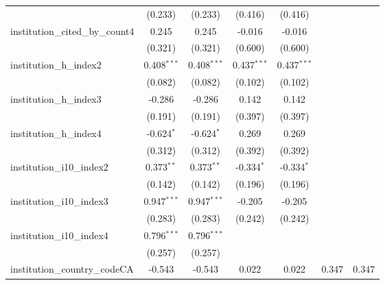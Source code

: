 \begin{tabular}{lcccccc}
                                         & (0.233)       & (0.233)       & (0.416)       & (0.416)       &                &   \\   
   institution\_cited\_by\_count4        & 0.245         & 0.245         & -0.016        & -0.016        &                &   \\   
                                         & (0.321)       & (0.321)       & (0.600)       & (0.600)       &                &   \\   
   institution\_h\_index2                & 0.408$^{***}$ & 0.408$^{***}$ & 0.437$^{***}$ & 0.437$^{***}$ &                &   \\   
                                         & (0.082)       & (0.082)       & (0.102)       & (0.102)       &                &   \\   
   institution\_h\_index3                & -0.286        & -0.286        & 0.142         & 0.142         &                &   \\   
                                         & (0.191)       & (0.191)       & (0.397)       & (0.397)       &                &   \\   
   institution\_h\_index4                & -0.624$^{*}$  & -0.624$^{*}$  & 0.269         & 0.269         &                &   \\   
                                         & (0.312)       & (0.312)       & (0.392)       & (0.392)       &                &   \\   
   institution\_i10\_index2              & 0.373$^{**}$  & 0.373$^{**}$  & -0.334$^{*}$  & -0.334$^{*}$  &                &   \\   
                                         & (0.142)       & (0.142)       & (0.196)       & (0.196)       &                &   \\   
   institution\_i10\_index3              & 0.947$^{***}$ & 0.947$^{***}$ & -0.205        & -0.205        &                &   \\   
                                         & (0.283)       & (0.283)       & (0.242)       & (0.242)       &                &   \\   
   institution\_i10\_index4              & 0.796$^{***}$ & 0.796$^{***}$ &               &               &                &   \\   
                                         & (0.257)       & (0.257)       &               &               &                &   \\   
   institution\_country\_codeCA          & -0.543        & -0.543        & 0.022         & 0.022         & 0.347          & 0.347\\   

\end{tabular}
